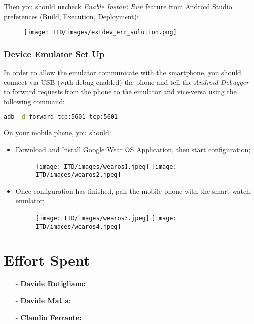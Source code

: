 \documentclass[a4paper]{article}
\begin{document}
Then you should uncheck \textit{Enable Instant Run} feature from Android Studio preferences (Build, Execution, Deployment):
\begin{figure}[!htpb]
    \centering
    \texttt{[image: ITD/images/extdev\_err\_solution.png]}
    \end{figure}

\subsubsection{Device Emulator Set Up}
In order to allow the emulator communicate with the smartphone, you should connect via USB (with debug enabled) the phone and tell the \textit{Android Debugger} to forward requests from the phone to the emulator and vice-versa using the following command: 

\begin{lstlisting}[language=bash]
adb -d forward tcp:5601 tcp:5601
\end{lstlisting}

On your mobile phone, you should:
\begin{itemize}
    \item Download and Install Google Wear OS Application, then start configuration;
    \begin{figure}[!htpb]
    \centering
    \texttt{[image: ITD/images/wearos1.jpeg]}
    \texttt{[image: ITD/images/wearos2.jpeg]}
    \end{figure}
    \item Once configuration has finished, pair the mobile phone with the smart-watch emulator;
    \begin{figure}[!htpb]
    \centering
    \texttt{[image: ITD/images/wearos3.jpeg]}
    \texttt{[image: ITD/images/wearos4.jpeg]}
    \end{figure}
\end{itemize}

\newpage
\section{Effort Spent}
    \begin{itemize}
        \item[-] \textbf{Davide Rutigliano: }
        
        \item[-] \textbf{Davide Matta: }
        
        \item[-] \textbf{Claudio Ferrante: }
    \end{itemize}
\end{document}
